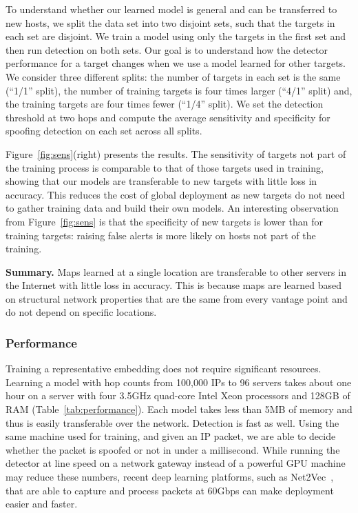 To understand whether our learned model is general and can be transferred to new hosts, we split the data set into two disjoint sets, such that the targets in each set are disjoint. We train a model using only the targets in the first set and then run detection on both sets. Our goal is to understand how the detector performance for a target changes when we use a model learned for other targets. We consider three different splits: the number of targets in each set is the same (``1/1'' split), the number of training targets is four times larger (``4/1'' split) and, the training targets are four times fewer (``1/4'' split). We set the detection threshold at two hops and compute the average sensitivity and specificity for spoofing detection on each set across all splits. 

Figure~\ref{fig:sens}(right) presents the results. The sensitivity of targets not part of the training process is comparable to that of those targets used in training, showing that our models are transferable to new targets with little loss in accuracy. This reduces the cost of global deployment as new targets do not need to gather training data and build their own models. An interesting observation from Figure~\ref{fig:sens} is that the specificity of new targets is lower than for training targets: raising false alerts is more likely on hosts not part of the training.

{\bf Summary.} Maps learned at a single location are transferable to other servers in the Internet with little loss in accuracy. This is because maps are learned based on structural network properties that are the same from every vantage point and do not depend on specific locations. 


\subsubsection{Performance}

Training a representative embedding does not require significant resources. Learning a model with hop counts from 100,000 IPs to 96 servers takes about one hour on a server with four 3.5GHz quad-core Intel Xeon processors and 128GB of RAM (Table~\ref{tab:performance}). Each model takes less than 5MB of memory and thus is easily transferable over the network. Detection is fast as well. Using the same machine used for training, and given an IP packet, we are able to decide whether the packet is spoofed or not in under a millisecond. While running the detector at line speed on a network gateway instead of a powerful GPU machine may reduce these numbers, recent deep learning platforms, such as Net2Vec~\citep{net2vec}, that are able to capture and process packets at 60Gbps can make deployment easier and faster.

